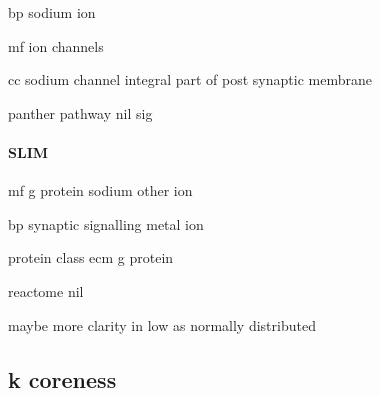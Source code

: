 bp sodium ion

mf ion channels

cc sodium channel integral part of post synaptic membrane

panther pathway nil sig

\paragraph{SLIM}

mf g protein sodium other ion

bp synaptic signalling metal ion


protein class
ecm g protein

reactome nil

maybe more clarity in low as normally distributed

\subsection{k coreness}
